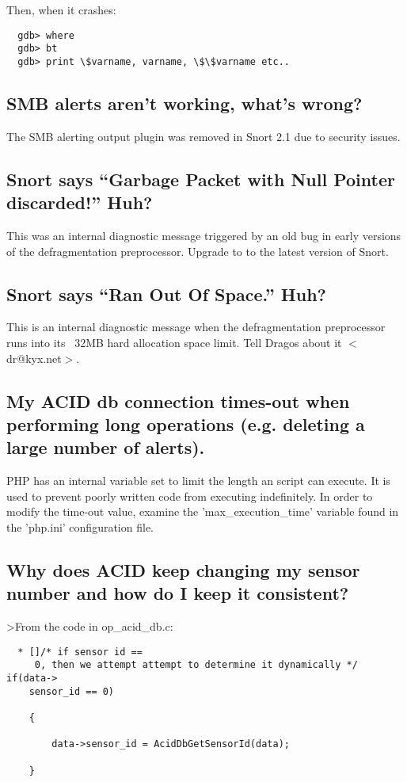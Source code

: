 \documentclass{article}
\begin{document}
Then, when it crashes:
\begin{verbatim}
  gdb> where
  gdb> bt
  gdb> print \$varname, varname, \$\$varname etc..
\end{verbatim}

\subsection{SMB alerts aren't working, what's wrong? }

The SMB alerting output plugin was removed in Snort 2.1 due to security issues.
 
\subsection{Snort says ``Garbage Packet with Null Pointer discarded!'' Huh?}

 This was an internal diagnostic message triggered by an old bug
in early versions of the defragmentation preprocessor.  Upgrade to 
to the latest version of Snort.

\subsection{Snort says ``Ran Out Of Space.'' Huh?}

This is an internal diagnostic message when the defragmentation
preprocessor runs into its ~32MB hard allocation space limit.
Tell Dragos about it $<$dr@kyx.net$>$.

\subsection{My ACID db connection times-out when performing long operations (e.g.
deleting a large number of alerts).}

PHP has an internal variable set to limit the length an script can execute. It
is used to prevent poorly written code from executing indefinitely. In order to
modify the time-out value, examine the 'max\_execution\_time' variable found in
the 'php.ini' configuration file.

\subsection{Why does ACID keep changing my sensor number and how do I keep it
consistent?}

>From the code in op\_acid\_db.c:
\begin{verbatim}
  * []/* if sensor id ==
     0, then we attempt attempt to determine it dynamically */ if(data->
    sensor_id == 0) 

    { 

        data->sensor_id = AcidDbGetSensorId(data); 

    }
\end{verbatim}
\end{document}
